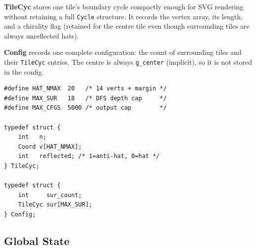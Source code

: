 \documentclass[10pt,a4paper]{article}
\let\polysubsection\subsection
\renewcommand\subsection{\needspace{0.12\textheight}\polysubsection}
\newcommand{\code}[1]{\texttt{\small #1}}
\begin{document}
\begin{tcolorbox}[dualbox, title={TileCyc and Config}]
  \textbf{TileCyc} stores one tile's boundary cycle compactly enough
  for SVG rendering without retaining a full \code{Cycle} structure.
  It records the vertex array, its length, and a chirality flag
  (retained for the centre tile even though surrounding tiles are always
  unreflected hats).

  \textbf{Config} records one complete configuration: the count of
  surrounding tiles and their \code{TileCyc} entries.  The centre is
  always \code{g\_center} (implicit), so it is not stored in the config.
\tcblower
\begin{verbatim}
#define HAT_NMAX  20   /* 14 verts + margin */
#define MAX_SUR   18   /* DFS depth cap     */
#define MAX_CFGS  5000 /* output cap        */

typedef struct {
    int   n;
    Coord v[HAT_NMAX];
    int   reflected; /* 1=anti-hat, 0=hat */
} TileCyc;

typedef struct {
    int     sur_count;
    TileCyc sur[MAX_SUR];
} Config;
\end{verbatim}
\end{tcolorbox}

\subsection{Global State}
\end{document}
